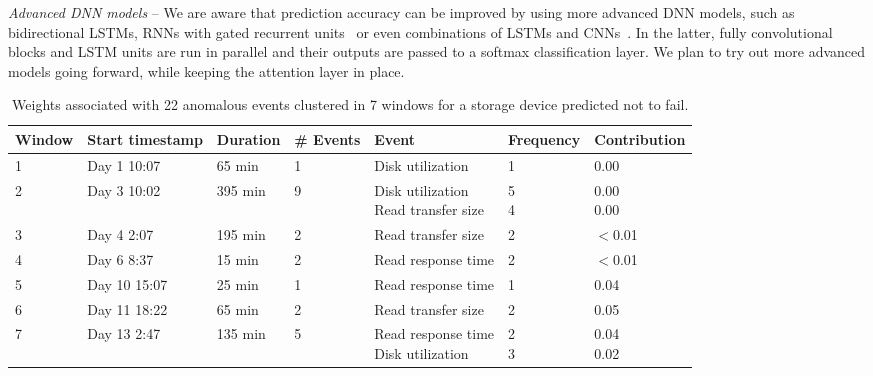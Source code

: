 \documentclass[letterpaper]{article} %
\begin{document}
\textit{Advanced DNN models} -- We are aware that prediction accuracy can be improved by using more advanced DNN models, such as bidirectional LSTMs, RNNs with gated recurrent units~\cite{gru} or even combinations of LSTMs and CNNs~\cite{lstmcnn}. In the latter, fully convolutional blocks and LSTM units are run in parallel and their outputs are passed to a softmax classification layer. We plan to try out more advanced models going forward, while keeping the attention layer in place.


\begin{table}
\centering
\begin{tabular}{| l | l | l | l | l | l | l |}
\hline
\textbf{Window} & \textbf{Start timestamp} & \textbf{Duration} & \textbf{\# Events} &\textbf{Event} & \textbf{Frequency} & \textbf{Contribution} \\
\hline
1 & Day 1 10:07 & 65 min & 1& Disk utilization & 1 & 0.00 \\
\hline
2 & Day 3 10:02 & 395 min & 9& \shortstack[l]{Disk utilization\\Read transfer size} & \shortstack{5\\4} & \shortstack{0.00\\0.00} \\
\hline
3 & Day 4 2:07&195 min&2& Read transfer size & 2 & $<$0.01\\
\hline
4 & Day 6 8:37& 15 min &2& Read response time & 2 & $<$0.01 \\
\hline
5 & Day 10 15:07  & 25 min&1& Read response time& 1 & 0.04\\
\hline
6 & Day 11 18:22 & 65 min &2& Read transfer size & 2& 0.05\\
\hline
7 & Day 13 2:47 & 135 min &5& \shortstack[l]{Read response time\\Disk utilization} & \shortstack{2\\3} & \shortstack{0.04\\0.02} \\
\hline
\end{tabular}
\caption{Weights associated with 22 anomalous events clustered in 7 windows for a storage device predicted not to fail.}
\label{nofail}
\end{table}
\end{document}
